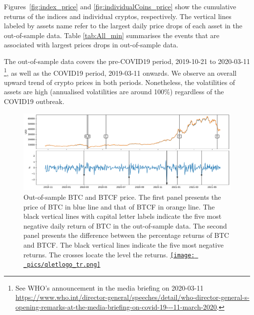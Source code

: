 \documentclass[11pt,a4paper,english]{article}
\begin{document}
Figures~\ref{fig:index_price} and \ref{fig:individualCoins_price} show
the cumulative returns of the indices and individual cryptos,
respectively.  The vertical lines labeled by assets name refer to the 
largest daily price drops of each asset in the out-of-sample data.  
Table \ref{tab:All_min} summarises the events that are associated with largest prices drops in 
out-of-sample data. 

The out-of-sample data covers the pre-COVID19 period, 2019-10-21 to
2020-03-11 \footnote{See WHO's announcement in the media briefing on 2020-03-11 \url{https://www.who.int/director-general/speeches/detail/who-director-general-s-opening-remarks-at-the-media-briefing-on-covid-19---11-march-2020}.}, as well as the COVID19 period, 2019-03-11 onwards. 
We observe an overall upward trend of crypto prices in both periods.
Nonetheless, the volatilities of assets are high (annualised volatilities are around
100\%) regardless of the COVID19 outbreak. 

\newpage
\begin{figure}[t]
\includegraphics[width=\textwidth]{_pics/BTC_price.pdf}
  \caption{Out-of-sample BTC and BTCF price. The first panel presents the price of BTC in blue line and that of BTCF in orange line.
  The black vertical lines with capital letter labels indicate the five most negative daily return of BTC in the out-of-sample data.
  The second panel presents the difference between the percentage returns of BTC and BTCF.
  The black vertical lines indicate the five most negative returns.
  The crosses locate the level the returns.
 \href{https://github.com/QuantLet/Hedging-Cryptos-with-Bitcoin-Futures/blob/main/newToQuantlet/Pynotebooks/figures/Figure 3_4_5.ipynb}{\texttt{[image: \_pics/qletlogo\_tr.png]}} }
\label{fig:BTC_price}
\end{figure}
\end{document}
